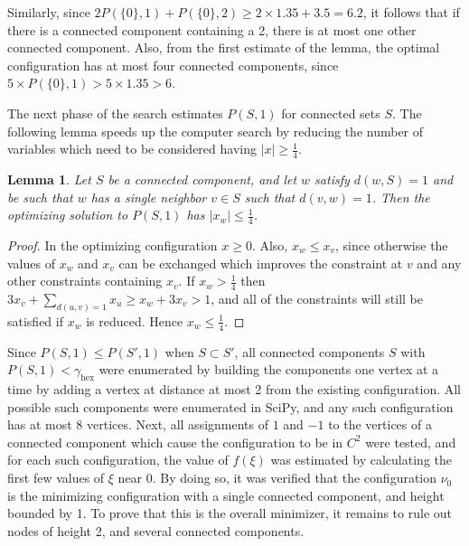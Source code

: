 \documentclass[a4paper, 12pt, notitlepage]{amsart}
\newcommand{\hex}{\operatorname{hex}}
\newtheorem{lemma}[theorem]{Lemma}
\theoremstyle{remark}
\begin{document}
Similarly, since $2 P(\{0\}, 1) + P(\{0\}, 2) \geq 2 \times 1.35 + 3.5 = 6.2$, it follows that if there is a connected component containing a 2, there is at most one other connected component. Also, from the first estimate of the lemma, the optimal configuration has at most four connected components, since $5 \times P(\{0\}, 1) > 5 \times 1.35 > 6$.

The next phase of the search estimates $P(S, 1)$ for connected sets $S$.  The following lemma speeds up the computer search by reducing the number of variables which need to be considered having $|x| \geq \frac{1}{4}$.

\begin{lemma}
 Let $S$ be a connected component, and let $w$ satisfy $d(w,S) = 1$ and be such that $w$ has a single neighbor $v \in S$ such that $d(v,w) = 1$. Then the optimizing solution to $P(S,1)$ has $|x_w| \leq \frac{1}{4}$.
\end{lemma}

\begin{proof}
 In the optimizing configuration $x \geq 0$.  Also, $x_w \leq x_v$, since otherwise the values of $x_w$ and $x_v$ can be exchanged which improves the constraint at $v$ and any other constraints containing $x_v$.  If $x_w > \frac{1}{4}$ then $3x_v + \sum_{d(u,v)=1} x_u \geq x_w + 3 x_v > 1$, and all of the constraints will still be satisfied if $x_w$ is reduced.  Hence $x_w \leq \frac{1}{4}$.
\end{proof}

 
 Since $P(S,1) \leq P(S',1)$ when $S \subset S'$, all connected components $S$ with $P(S,1) < \gamma_{\hex}$ were enumerated by building the components one vertex at a time by adding a vertex at distance at most 2 from the existing configuration.  All possible such components were enumerated in SciPy, and any such configuration has at most 8 vertices.  Next, all assignments of $1$ and $-1$ to the vertices of a connected component which cause the configuration to be in $C^2$ were tested, and for each such configuration, the value of $f(\xi)$ was estimated by calculating the first few values of $\xi$ near 0.  By doing so, it was verified that the configuration $\nu_0$ is the minimizing configuration with a single connected component, and height bounded by 1.  To prove that this is the overall minimizer, it remains to rule out nodes of height 2, and several connected components.
\end{document}
